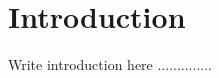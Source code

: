 
\setcounter{secnumdepth}{5}
\chapter{Introduction}
\thispagestyle{empty}
\glsresetall
\label{Chapter1}

Write introduction here ..............

\newpage
